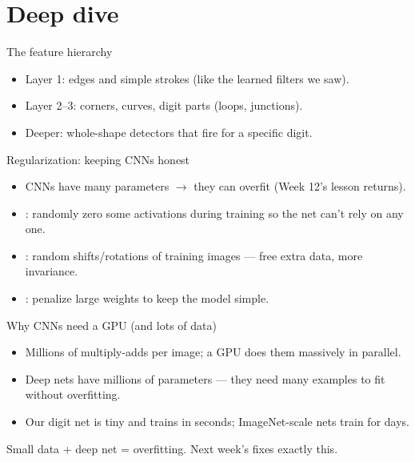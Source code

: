 \documentclass[10pt,aspectratio=169]{beamer}
\begin{document}
\section{Deep dive}

\begin{frame}{The feature hierarchy}
  \begin{itemize}
    \item Layer 1: edges and simple strokes (like the learned filters we saw).
    \item Layer 2--3: corners, curves, digit parts (loops, junctions).
    \item Deeper: whole-shape detectors that fire for a specific digit.
  \end{itemize}
\end{frame}

\begin{frame}{Regularization: keeping CNNs honest}
  \begin{itemize}
    \item CNNs have many parameters $\rightarrow$ they can overfit (Week 12's lesson returns).
    \item {}: randomly zero some activations during training so the net can't rely on any one.
    \item {}: random shifts/rotations of training images — free extra data, more invariance.
    \item {}: penalize large weights to keep the model simple.
  \end{itemize}
\end{frame}

\begin{frame}{Why CNNs need a GPU (and lots of data)}
  \begin{itemize}
    \item Millions of multiply-adds per image; a GPU does them massively in parallel.
    \item Deep nets have millions of parameters — they need many examples to fit without overfitting.
    \item Our digit net is tiny and trains in seconds; ImageNet-scale nets train for days.
  \end{itemize}
  \begin{goodbox}
    Small data + deep net = overfitting. Next week's  fixes exactly this.
  \end{goodbox}
\end{frame}
\end{document}
